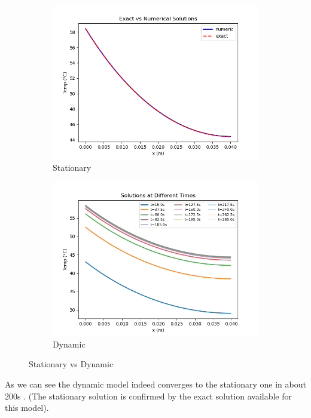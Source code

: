 \documentclass{article}
\begin{document}
\begin{figure}[H]
\begin{subfigure}{.5\textwidth}
  \centering
  \includegraphics[width=1.1\linewidth]{images/static_graph.png}
  \caption{Stationary}
  \label{fig:sfig1}
\end{subfigure}
\begin{subfigure}{.5\textwidth}
  \centering
  \includegraphics[width=1.1\linewidth]{images/dyna_graph.png}
  \caption{Dynamic}
\end{subfigure}
\caption{Stationary vs Dynamic }
\label{fig:fig}
\end{figure}

As we can see the dynamic model indeed converges to the stationary one in about 200s . (The stationary solution is confirmed by the exact solution available for this model). 
\end{document}
